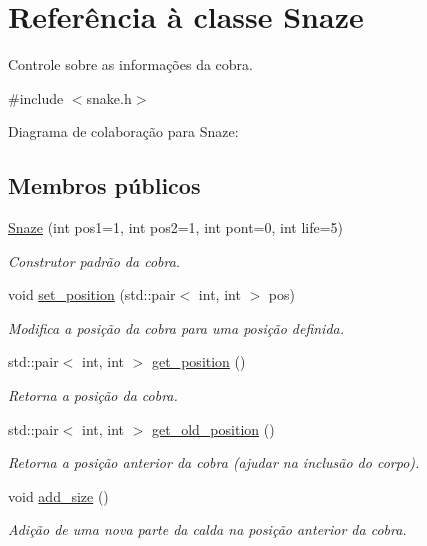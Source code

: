\hypertarget{classSnaze}{}\section{Referência à classe Snaze}
\label{classSnaze}


Controle sobre as informações da cobra.  




{\ttfamily \#include $<$snake.\+h$>$}



Diagrama de colaboração para Snaze\+:
\subsection*{Membros públicos}
\begin{DoxyCompactItemize}
\item 
\hyperlink{classSnaze_adfe6d312b7839c8e81d9c05c43367870}{Snaze} (int pos1=1, int pos2=1, int pont=0, int life=5)
\begin{DoxyCompactList}\small\item\em Construtor padrão da cobra. \end{DoxyCompactList}\item 
void \hyperlink{classSnaze_aa044b29757e0177ec1b386ca4765d3fa}{set\+\_\+position} (std\+::pair$<$ int, int $>$ pos)
\begin{DoxyCompactList}\small\item\em Modifica a posição da cobra para uma posição definida. \end{DoxyCompactList}\item 
std\+::pair$<$ int, int $>$ \hyperlink{classSnaze_a81158f1529cf56aedb109a449fbba85b}{get\+\_\+position} ()
\begin{DoxyCompactList}\small\item\em Retorna a posição da cobra. \end{DoxyCompactList}\item 
std\+::pair$<$ int, int $>$ \hyperlink{classSnaze_acc7755b314cb101bf9524fca1025a6da}{get\+\_\+old\+\_\+position} ()
\begin{DoxyCompactList}\small\item\em Retorna a posição anterior da cobra (ajudar na inclusão do corpo). \end{DoxyCompactList}\item 
void \hyperlink{classSnaze_a1746ce635a204cc0bd4544e6cfbcbdbc}{add\+\_\+size} ()
\begin{DoxyCompactList}\small\item\em Adição de uma nova parte da calda na posição anterior da cobra. \end{DoxyCompactList}\item 

\end{DoxyCompactItemize}
